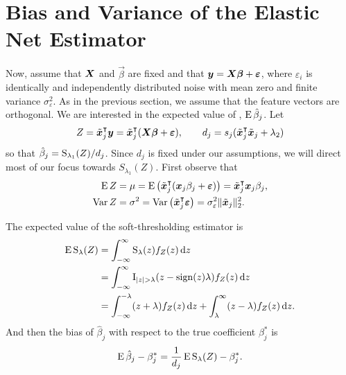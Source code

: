 \section{Bias and Variance of the Elastic Net Estimator}\label{sec:theory}


Now, assume that \(\boldsymbol{X}\) and \(\vec{\beta}\) are fixed and that \(\boldsymbol{y} = \boldsymbol{X}\boldsymbol{\beta} + \boldsymbol{\varepsilon}\), where \(\varepsilon_i\) is identically and independently distributed noise with mean zero and finite variance \(\sigma_\varepsilon^2\). As in the previous section, we assume that the feature vectors are orthogonal. We are interested in the expected value of , \(\operatorname{E} \hat{\beta}_j\). Let
\[
  Z = \tilde{\boldsymbol{x}}_j^\intercal \boldsymbol{y} = \tilde{\boldsymbol{x}}_j^\intercal(\boldsymbol{X}\boldsymbol{\beta} + \boldsymbol{\varepsilon}),
  \qquad
  d_j = s_j(\tilde{\boldsymbol{x}}_j^\intercal \tilde{\boldsymbol{x}}_j + \lambda_2)
\]
so that \(\hat{\beta}_j = \operatorname{S}_{\lambda_1}(Z)/d_j\). Since \(d_j\) is fixed under our assumptions, we will direct most of our focus towards \(S_{\lambda_1}(Z)\). First observe that
\begin{align*}
  \operatorname{E} Z   & = \mu = \operatorname{E} \left( \tilde{\boldsymbol{x}}_j^\intercal (\boldsymbol{x}_j\beta_j + \boldsymbol{\varepsilon}) \right)  = \tilde{\boldsymbol{x}}_j^\intercal\boldsymbol{x}_j \beta_j,  \\
  \operatorname{Var} Z & = \sigma^2 = \operatorname{Var}\left(\tilde{\boldsymbol{x}}_j ^\intercal \boldsymbol{\varepsilon}\right) = \sigma_\varepsilon^2 \lVert \tilde{\boldsymbol{x}}_j\rVert_2^2.
\end{align*}

The expected value of the soft-thresholding estimator is
\begin{align*}
  \label{eq:st-expected-value}
  \operatorname{E} \operatorname{S}_\lambda(Z) & = \int_{-\infty}^\infty \operatorname{S}_\lambda(z) f_Z(z) \mathop{}\!\mathrm{d} z                                                   \nonumber \\
                    & = \int_{-\infty}^\infty \operatorname{I}_{|z| > \lambda} (z -\operatorname{sign}(z)\lambda) f_Z(z) \mathop{}\!\mathrm{d} z                         \nonumber \\
                    & = \int_{-\infty}^{-\lambda}(z + \lambda)f_Z(z) \mathop{}\!\mathrm{d} z + \int_{\lambda}^\infty (z - \lambda)f_Z(z) \mathop{}\!\mathrm{d} z.
\end{align*}
And then the bias of \(\hat\beta_j\) with respect to the true coefficient \(\beta_j^*\) is
\begin{equation*}
  \label{eq:betahat-bias}
  \operatorname{E} \hat\beta_j - \beta_j^* = \frac{1}{d_j}\operatorname{E} \operatorname{S}_\lambda(Z) - \beta^*_j.
\end{equation*}

